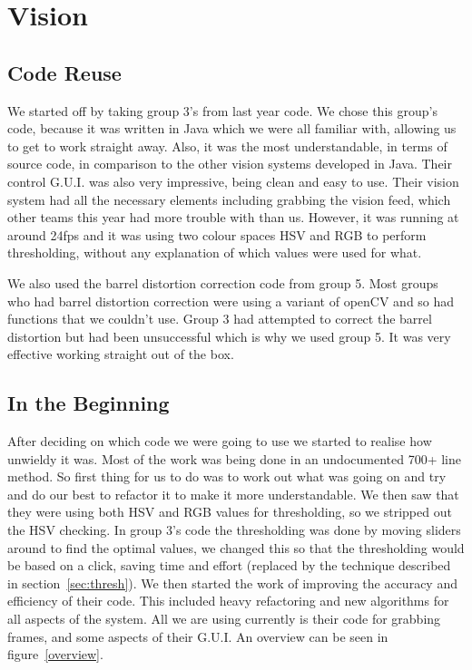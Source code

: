 \section{Vision}

\subsection{Code Reuse}

We started off by taking group 3's from last year code. We chose this group's code, because it was written in Java which we were all familiar with, allowing us to get to work straight away. Also, it was the most understandable, in terms of source code, in comparison to the other vision systems developed in Java. Their control G.U.I. was also very impressive, being clean and easy to use. Their vision system had all the necessary elements including grabbing the vision feed, which other teams this year had more trouble with than us. However, it was running at around 24fps and it was using two colour spaces HSV and RGB to perform thresholding, without any explanation of which values were used for what. 

We also used the barrel distortion correction code from group 5.  Most groups who had barrel distortion correction were using a variant of openCV and so had functions that we couldn't use.  Group 3 had attempted to correct the barrel distortion but had been unsuccessful which is why we used group 5.  It was very effective working straight out of the box.

\subsection{In the Beginning}

After deciding on which code we were going to use we started to realise how unwieldy it was. Most of the work was being done in an undocumented 700+ line method.  So first thing for us to do was to work out what was going on and try and do our best to refactor it to make it more understandable.  We then saw that they were using both HSV and RGB values for thresholding, so we stripped out the HSV checking.  In group 3's code the thresholding was done by moving sliders around to find the optimal values, we changed this so that the thresholding would be based on a click, saving time and effort (replaced by the technique described in section~\ref{sec:thresh}).  We then started the work of improving the accuracy and efficiency of their code.  This included heavy refactoring and new algorithms for all aspects of the system.  All we are using currently is their code for grabbing frames, and some aspects of their G.U.I. An overview can be seen in figure~\ref{overview}.


